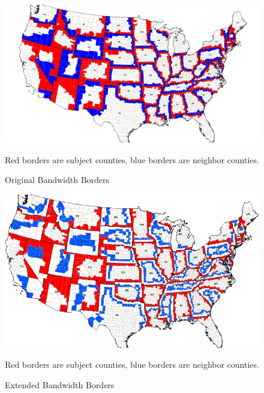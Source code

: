 \documentclass[12pt,a4paper]{article}
\begin{document}
\begin{figure}[h]\label{eb}
    \centering
    \caption{Original Bandwidth Borders}\par\medskip
        \begin{minipage}{0.70\textwidth}
    \includegraphics[scale = 0.20]{../analysis/output/rb_picture.png}
    {\footnotesize Red borders are subject counties, blue borders are neighbor counties.\par}
    \end{minipage}
\end{figure}

\begin{figure}[h]
    \centering
    \caption{Extended Bandwidth Borders}\par\medskip
            \begin{minipage}{0.70\textwidth}
    \includegraphics[scale = 0.5]{../analysis/output/eb_picture.png}
    {\footnotesize Red borders are subject counties, blue borders are neighbor counties. \par}
    \end{minipage}
\end{figure}
\end{document}

